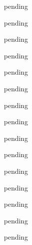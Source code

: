 \begin{exercise} \label{0.74}
	pending
\end{exercise}

\begin{exercise} \label{0.75}
	pending
\end{exercise}

\begin{exercise} \label{0.76}
	pending
\end{exercise}

\begin{exercise} \label{0.77}
	pending
\end{exercise}

\begin{exercise} \label{0.78}
	pending
\end{exercise}

\begin{exercise} \label{0.79}
	pending
\end{exercise}

\begin{exercise} \label{0.80}
	pending
\end{exercise}

\begin{exercise} \label{0.81}
	pending
\end{exercise}

\begin{exercise} \label{0.82}
	pending
\end{exercise}

\begin{exercise} \label{0.83}
	pending
\end{exercise}

\begin{exercise} \label{0.84}
	pending
\end{exercise}

\begin{exercise} \label{0.85}
	pending
\end{exercise}

\begin{exercise} \label{0.86}
	pending
\end{exercise}

\begin{exercise} \label{0.87}
	pending
\end{exercise}

\begin{exercise} \label{0.88}
	pending
\end{exercise}

